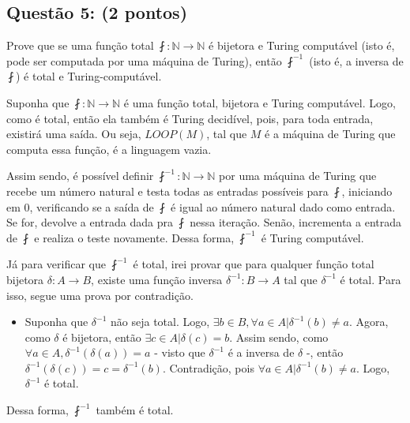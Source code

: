 \documentclass{article}
\begin{document}
\subsection*{Questão 5: (2 pontos)} Prove que se uma função total $\fint : \mathds{N} \to \mathds{N}$ é bijetora e Turing computável (isto é, pode ser computada por uma máquina de Turing), então $\fint^{-1}$ (isto é, a inversa de $\fint$) é total e Turing-computável.

{
\color{blue}
  \par Suponha que $\fint : \mathds{N} \to \mathds{N}$ é uma função total, bijetora e Turing computável. Logo, como é total, então ela também é Turing decidível, pois, para toda entrada, existirá uma saída. Ou seja, $LOOP(M)$, tal que $M$ é a máquina de Turing que computa essa função, é a linguagem vazia.
  \par Assim sendo, é possível definir $\fint^{-1} : \mathds{N} \to \mathds{N}$ por uma máquina de Turing que recebe um número natural e testa todas as entradas possíveis para $\fint$, iniciando em 0, verificando se a saída de $\fint$ é igual ao número natural dado como entrada. Se for, devolve a entrada dada pra $\fint$ nessa iteração. Senão, incrementa a entrada de $\fint$ e realiza o teste novamente. Dessa forma, $\fint^{-1}$ é Turing computável.
  \par Já para verificar que $\fint^{-1}$ é total, irei provar que para qualquer função total bijetora $\delta: A \to B$, existe uma função inversa $\delta^{-1}: B \to A$ tal que $\delta^{-1}$ é total. Para isso, segue uma prova por contradição.
  \begin{itemize}
    \item Suponha que $\delta^{-1}$ não seja total. Logo, $\exists b \in B, \forall a \in A | \delta^{-1}(b) \neq a$. Agora, como $\delta$ é bijetora, então $\exists c \in A | \delta(c) = b$. Assim sendo, como $\forall a \in A, \delta^{-1}(\delta(a))=a$ - visto que $\delta^{-1}$ é a inversa de $\delta$ -, então $\delta^{-1}(\delta(c))=c=\delta^{-1}(b)$. Contradição, pois $\forall a \in A | \delta^{-1}(b) \neq a$. Logo, $\delta^{-1}$ é total.
  \end{itemize}
  Dessa forma, $\fint^{-1}$ também é total.
}
\end{document}
